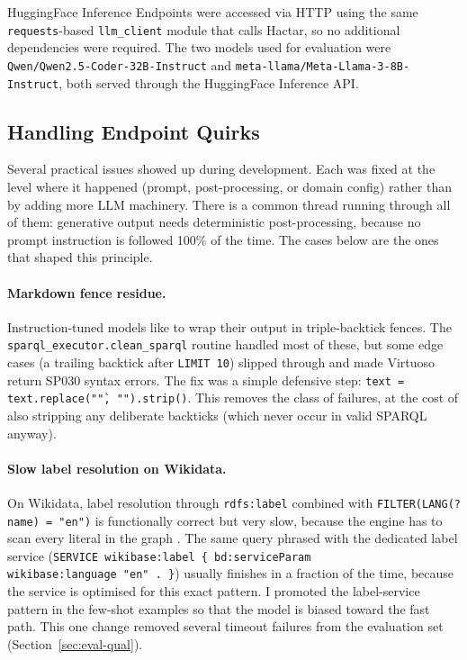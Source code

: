 \documentclass[11pt,a4paper]{article}
\begin{document}
HuggingFace Inference Endpoints were accessed via HTTP using the same \texttt{requests}-based \texttt{llm\_client} module that calls Hactar, so no additional dependencies were required. The two models used for evaluation were \texttt{Qwen/Qwen2.5-Coder-32B-Instruct} and \texttt{meta-llama/Meta-Llama-3-8B-Instruct}, both served through the HuggingFace Inference API.


\subsection{Handling Endpoint Quirks}
\label{sec:quirks}
Several practical issues showed up during development. Each was
fixed at the level where it happened (prompt, post-processing, or
domain config) rather than by adding more LLM machinery. There is a
common thread running through all of them: generative output needs
deterministic post-processing, because no prompt instruction is
followed 100\% of the time. The cases below are the ones that
shaped this principle.

\paragraph{Markdown fence residue.}
Instruction-tuned models like to wrap their output in triple-backtick
fences. The \texttt{sparql\_executor.clean\_sparql} routine handled
most of these, but some edge cases (a trailing backtick after
\texttt{LIMIT~10}) slipped through and made Virtuoso return SP030
syntax errors. The fix was a simple defensive step:
\texttt{text\,=\,text.replace("\`",\,"").strip()}. This removes the
class of failures, at the cost of also stripping any deliberate
backticks (which never occur in valid SPARQL anyway).

\paragraph{Slow label resolution on Wikidata.}
On Wikidata, label resolution through \texttt{rdfs:label} combined
with \texttt{FILTER(LANG(?name) = "en")} is functionally correct but
very slow, because the engine has to scan every literal in the
graph \cite{vrandecic2014wikidata}. The same query phrased with the
dedicated label service
(\texttt{SERVICE\,wikibase:label\,\{\,bd:serviceParam\,wikibase:language\,"en"\,.\,\}})
usually finishes in a fraction of the time, because the service is
optimised for this exact pattern. I promoted the label-service
pattern in the few-shot examples so that the model is biased toward
the fast path. This one change removed several timeout failures
from the evaluation set (Section~\ref{sec:eval-qual}).
\end{document}
